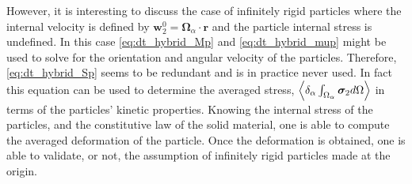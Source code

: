 However, it is interesting to discuss the case of infinitely rigid particles where the internal velocity is defined by $\textbf{w}_2^0 = \bm\Omega_\alpha \cdot \textbf{r}$ and the particle internal stress is undefined. 
In this case \ref{eq:dt_hybrid_Mp} and \ref{eq:dt_hybrid_mup} might be used to solve for the orientation and angular velocity of the particles. 
Therefore, \ref{eq:dt_hybrid_Sp} seems to be redundant and is in practice never used. 
In fact this equation can be used to determine the averaged stress, $\left<\delta_\alpha \int_{\Omega_\alpha} \bm{\sigma}_2 d\Omega\right>$ in terms of the particles' kinetic properties. 
Knowing the internal stress of the particles, and the constitutive law of the solid material, one is able to compute the averaged deformation of the particle. 
Once the deformation is obtained, one is able to validate, or not, the assumption of infinitely rigid particles made at the origin. 

